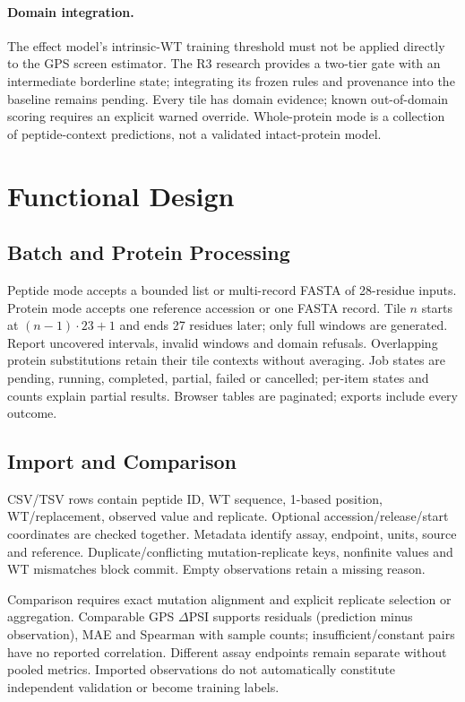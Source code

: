 

\paragraph{Domain integration.}
The effect model's intrinsic-WT training threshold must not be applied directly to the GPS screen
estimator. The R3 research provides a two-tier gate with an intermediate borderline state; integrating
its frozen rules and provenance into the baseline remains pending. Every tile has domain evidence;
known out-of-domain scoring requires an explicit warned override. Whole-protein mode is a collection
of peptide-context predictions, not a validated intact-protein model.

\section{Functional Design}
\subsection{Batch and Protein Processing}
Peptide mode accepts a bounded list or multi-record FASTA of 28-residue inputs. Protein mode accepts
one reference accession or one FASTA record. Tile $n$ starts at $(n-1)\cdot23+1$ and ends 27 residues
later; only full windows are generated. Report uncovered intervals, invalid windows and domain
refusals. Overlapping protein substitutions retain their tile contexts without averaging.
Job states are pending, running, completed, partial, failed or cancelled; per-item states and counts
explain partial results. Browser tables are paginated; exports include every outcome.

\subsection{Import and Comparison}
CSV/TSV rows contain peptide ID, WT sequence, 1-based position, WT/replacement, observed value and
replicate. Optional accession/release/start coordinates are checked together. Metadata identify assay,
endpoint, units, source and reference. Duplicate/conflicting mutation-replicate keys, nonfinite values
and WT mismatches block commit. Empty observations retain a missing reason.

Comparison requires exact mutation alignment and explicit replicate selection or aggregation.
Comparable GPS $\Delta$PSI supports residuals (prediction minus observation), MAE and Spearman with
sample counts; insufficient/constant pairs have no reported correlation. Different assay endpoints
remain separate without pooled metrics. Imported observations do not automatically constitute
independent validation or become training labels.

